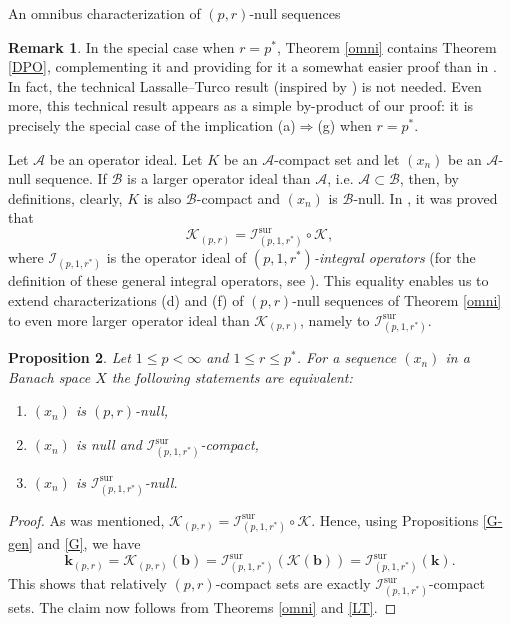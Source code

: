 \documentclass[a4paper,11pt]{amsart}
\newtheorem{prop}{Proposition}[section]
\theoremstyle{definition}
\newtheorem{rem}[prop]{Remark}
\theoremstyle{definition}
\theoremstyle{definition}
\begin{document}
\begin{section}{An omnibus characterization of $(p,r)$-null sequences}
\begin{rem}\label{R3.3}
In the special case when $r={p^{\ast}}$, Theorem \ref{omni} contains Theorem \ref{DPO}, complementing it and providing for it a somewhat easier proof than in \cite{LT}. In fact, the technical Lassalle--Turco result \cite[Proposition 1.5]{LT} (inspired by \cite[Theorem 1]{AMR}) is not needed. Even more, this technical result appears as a simple by-product of our proof: it is precisely the special case of the implication (a)$\Rightarrow$(g) when $r= {p^{\ast}}$.
\end{rem}

Let ${{\mathcal A}}$ be an operator ideal. Let $K$ be an ${{\mathcal A}}$-compact set and let $(x_n)$ be an ${{\mathcal A}}$-null sequence. If ${{\mathcal B}}$ is a larger operator ideal than ${{\mathcal A}}$, i.e. ${{\mathcal A}} \subset {{\mathcal B}}$, then, by definitions, clearly, $K$ is also ${{\mathcal B}}$-compact and $(x_n)$ is ${{\mathcal B}}$-null. In \cite[Proposition~4.7]{ALO}, it was proved  that 
\[
{{\mathcal K}}_{{(p,r)}} = {{\mathcal I}}_{(p,1,{r^{\ast}})}^\mathrm{sur} \circ {{\mathcal K}},
\]
where ${{\mathcal I}}_{(p,1, {r^{\ast}})}$ is the operator ideal of \emph{$(p,1,{r^{\ast}})$-integral operators} (for the definition of these general integral operators, see \cite[19.1.1]{P}). This equality enables us to extend characterizations (d) and (f) of ${{(p,r)}}$-null sequences of Theorem \ref{omni} to even more larger operator ideal than ${{\mathcal K}}_{{(p,r)}}$, namely to ${{\mathcal I}}_{(p,1,{r^{\ast}})}^\mathrm{sur}$.

\begin{prop}\label{prop3.3}
Let $1 \leq p < \infty$ and $1 \leq r \leq {p^{\ast}}$. For a sequence $(x_n)$ in a Banach space $X$ the following statements are equivalent:
\begin{enumerate}
\item $(x_n)$ is $(p,r)$-null,
\item $(x_n)$ is null and ${{\mathcal I}}_{(p,1,{r^{\ast}})}^\mathrm{sur}$-compact,
\item $(x_n)$ is ${{\mathcal I}}_{(p,1,{r^{\ast}})}^\mathrm{sur}$-null.
\end{enumerate}
\end{prop}

\begin{proof}
As was mentioned, ${{\mathcal K}}_{{(p,r)}} = {{\mathcal I}} _{(p,1, {r^{\ast}})}^\mathrm{sur}\circ {{\mathcal K}}$. Hence, using Propositions \ref{G-gen} and \ref{G}, we have
\[
{\boldsymbol{k}} _{{(p,r)}} = {{\mathcal K}}_{{(p,r)}} ({\boldsymbol{b}})= {{\mathcal I}}_{(p,1,{r^{\ast}})}^\mathrm{sur}({{\mathcal K}}({\boldsymbol{b}})) = {{\mathcal I}}_{(p,1,{r^{\ast}})}^\mathrm{sur} ({\boldsymbol{k}}).
\]
This shows that relatively ${{(p,r)}}$-compact sets are exactly ${{\mathcal I}}_{(p,1,{r^{\ast}})}^\mathrm{sur}$-compact sets. The claim now follows from Theorems \ref{omni} and \ref{LT}.
\end{proof}


\end{section}
\end{document}

